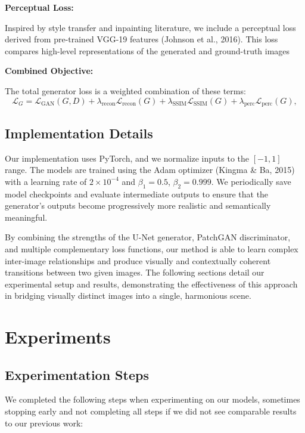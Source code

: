 \documentclass[sigconf]{acmart}
\begin{document}
\textbf{Perceptual Loss:}

Inspired by style transfer and inpainting literature, we include a perceptual loss derived from pre-trained VGG-19 features (Johnson et al., 2016). This loss compares high-level representations of the generated and ground-truth images

\textbf{Combined Objective:}

The total generator loss is a weighted combination of these terms:
\[
\mathcal{L}_{G} = \mathcal{L}_{\text{GAN}}(G,D) + \lambda_{\text{recon}}\mathcal{L}_{\text{recon}}(G) + \lambda_{\text{SSIM}}\mathcal{L}_{\text{SSIM}}(G) + \lambda_{\text{perc}}\mathcal{L}_{\text{perc}}(G),
\]


\subsection*{Implementation Details}

Our implementation uses PyTorch, and we normalize inputs to the $[-1, 1]$ range. The models are trained using the Adam optimizer (Kingma \& Ba, 2015) with a learning rate of $2 \times 10^{-4}$ and $\beta_1 = 0.5$, $\beta_2 = 0.999$. We periodically save model checkpoints and evaluate intermediate outputs to ensure that the generator’s outputs become progressively more realistic and semantically meaningful. 

By combining the strengths of the U-Net generator, PatchGAN discriminator, and multiple complementary loss functions, our method is able to learn complex inter-image relationships and produce visually and contextually coherent transitions between two given images. The following sections detail our experimental setup and results, demonstrating the effectiveness of this approach in bridging visually distinct images into a single, harmonious scene.

\section*{Experiments}

\subsection*{Experimentation Steps}

We completed the following steps when experimenting on our models, sometimes stopping early and not completing all steps if we did not see comparable results to our previous work:
\end{document}
